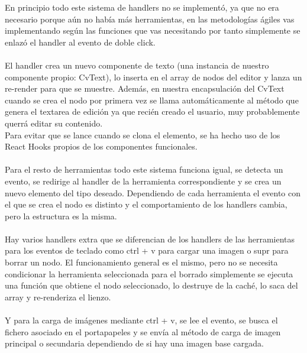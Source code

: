 En principio todo este sistema de handlers no se implementó, ya que no era necesario 
porque aún no había más herramientas, en las metodologías ágiles vas implementando según
las funciones que vas necesitando por tanto simplemente se enlazó el handler al evento
de doble click. 
\\\\
El handler crea un nuevo componente de texto (una instancia de nuestro componente propio: CvText),
lo inserta en el array de nodos del editor y lanza un re-render para que se muestre.
Además, en nuestra encapsulación del CvText cuando se crea el nodo por primera vez se
llama automáticamente al método que genera el textarea de edición ya que recién creado
el usuario, muy probablemente querrá editar su contenido.
\\
Para evitar que se lance cuando se clona el elemento, se ha hecho uso de los React Hooks\cite{React-Hooks}
propios de los componentes funcionales.
\\\\
Para el resto de herramientas todo este sistema funciona igual, se detecta un evento, se
redirige al handler de la herramienta correspondiente y se crea un nuevo elemento del tipo
deseado. Dependiendo de cada herramienta el evento con el que se crea el nodo es distinto y el 
comportamiento de los handlers cambia, pero la estructura es la misma. 
\\\\
Hay varios handlers extra que se diferencian de los handlers de las herramientas para los
eventos de teclado como ctrl + v para cargar una imagen o supr para borrar un nodo.
El funcionamiento general es el mismo, pero no se necesita condicionar la herramienta seleccionada
para el borrado simplemente se ejecuta una función que obtiene el nodo seleccionado, lo
destruye de la caché, lo saca del array y re-renderiza el lienzo.
\\\\
Y para la carga de imágenes mediante ctrl + v, se lee el evento, se busca el fichero asociado
en el portapapeles y se envía al método de carga de imagen principal o secundaria dependiendo
de si hay una imagen base cargada.

\newpage
